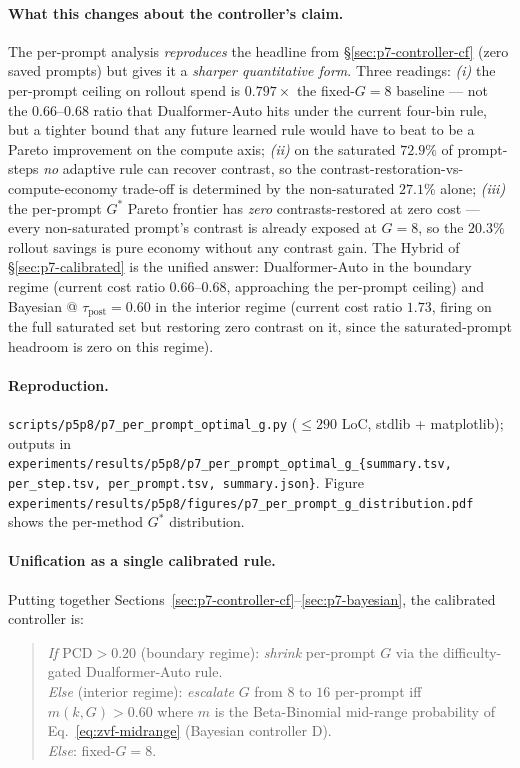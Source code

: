 \paragraph{What this changes about the controller's claim.}
The per-prompt analysis \emph{reproduces} the headline from
\S\ref{sec:p7-controller-cf} (zero saved prompts) but gives it a
\emph{sharper quantitative form}. Three readings:
\emph{(i)} the per-prompt ceiling on rollout spend is $0.797\times$ the
fixed-$G{=}8$ baseline --- not the $0.66$--$0.68$ ratio that Dualformer-Auto
hits under the current four-bin rule, but a tighter bound that any future
learned rule would have to beat to be a Pareto improvement on the
compute axis; \emph{(ii)} on the saturated $72.9\%$ of prompt-steps
\emph{no} adaptive rule can recover contrast, so the
contrast-restoration-vs-compute-economy trade-off is determined by the
non-saturated $27.1\%$ alone; \emph{(iii)} the per-prompt $G^*$ Pareto
frontier has \emph{zero} contrasts-restored at zero cost --- every
non-saturated prompt's contrast is already exposed at $G{=}8$, so the
$20.3\%$ rollout savings is pure economy without any contrast gain.
The Hybrid of \S\ref{sec:p7-calibrated} is the unified answer: Dualformer-Auto
in the boundary regime (current cost ratio $0.66$--$0.68$, approaching
the per-prompt ceiling) and Bayesian @ $\tau_\text{post} = 0.60$ in the
interior regime (current cost ratio $1.73$, firing on the full
saturated set but restoring zero contrast on it, since the
saturated-prompt headroom is zero on this regime).

\paragraph{Reproduction.}
\texttt{scripts/p5p8/p7\_per\_prompt\_optimal\_g.py} ($\leq 290$ LoC,
stdlib + matplotlib); outputs in
\texttt{experiments/results/p5p8/p7\_per\_prompt\_optimal\_g\_\{summary.tsv,
per\_step.tsv, per\_prompt.tsv, summary.json\}}.  Figure
\texttt{experiments/results/p5p8/figures/p7\_per\_prompt\_g\_distribution.pdf}
shows the per-method $G^*$ distribution.

\paragraph{Unification as a single calibrated rule.}
Putting together Sections~\ref{sec:p7-controller-cf}--\ref{sec:p7-bayesian},
the calibrated controller is:

\begin{quote}\small
\emph{If} $\mathrm{PCD} > 0.20$ (boundary regime): \emph{shrink} per-prompt
$G$ via the difficulty-gated Dualformer-Auto rule. \\
\emph{Else} (interior regime): \emph{escalate} $G$ from $8$ to $16$ per-prompt
iff $m(k, G) > 0.60$ where $m$ is the Beta-Binomial mid-range probability
of Eq.~\eqref{eq:zvf-midrange} (Bayesian controller D). \\
\emph{Else}: fixed-$G{=}8$.
\end{quote}

